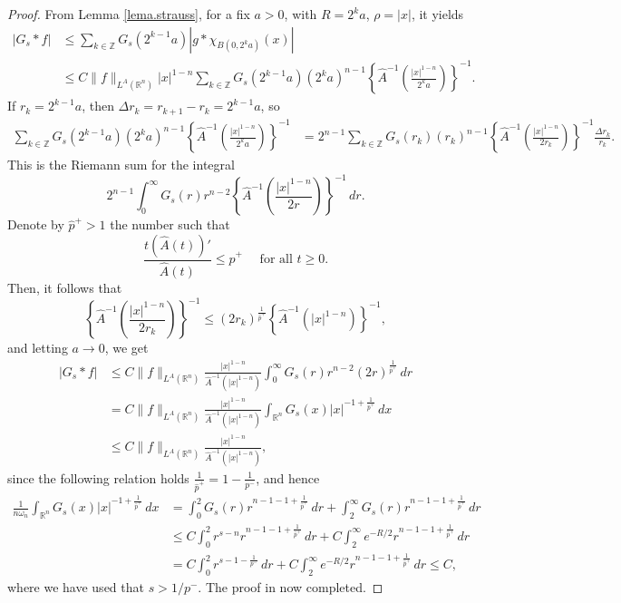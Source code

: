\documentclass[leqno,twoside, 12pt]{amsart}
\theoremstyle{plain}
\numberwithin{equation}{section} \numberwithin{figure}{section}
\theoremstyle{definition}
\newcommand{\R}{\mathbb R}
\numberwithin{equation}{section}
\begin{document}
\begin{proof}
From Lemma \ref{lema.strauss}, for a fix $a>0$, with $R=2^{k}a$, $\rho=|x|$, it  yields 
\begin{align*}
|G_s*f|&\leq \sum_{k\in \mathbb{Z}} G_s(2^{k-1}a) |g* \chi_{B(0,2^k a)}(x)|\\
&\leq C \|f\|_{L^A(\R^n)} |x|^{1-n} \sum_{k\in \mathbb{Z}} G_s(2^{k-1}a)   (2^k a)^{n-1} \left\{\hat A^{-1}\left( \frac{|x|^{1-n}}{2^k a}\right) \right\}^{-1}.
\end{align*}
If $r_k=2^{k-1}a$, then $\Delta r_k = r_{k+1}-r_k=2^{k-1}a$, so
\begin{align*}
\sum_{k\in \mathbb{Z}} G_s(2^{k-1}a)   (2^k a)^{n-1} \left\{\hat A^{-1}\left( \frac{|x|^{1-n}}{2^k a}\right) \right\}^{-1}&=
2^{n-1} \sum_{k\in \mathbb{Z}} G_s(r_k)   (r_k)^{n-1}  \left\{\hat A^{-1}\left( \frac{|x|^{1-n}}{2r_k}\right)  \right\}^{-1}\frac{\Delta r_k}{r_k}.
\end{align*}
This is the Riemann sum for the integral
$$
2^{n-1}\int_0^\infty G_s(r) r^{n-2} \left\{\hat A^{-1}\left( \frac{|x|^{1-n}}{2r}\right)  \right\}^{-1} \, dr.
$$
Denote by $\hat p^+>1$ the number such that
$$
\frac{t (\hat A(t))'}{\hat A(t)}\leq \hat p^+ \quad \text{ for all }t\geq 0.
$$
Then, it follows that
$$
\left\{\hat A^{-1}\left( \frac{|x|^{1-n}}{2r_k}\right)  \right\}^{-1}\leq  (2r_k)^\frac{1}{\hat p^+} \left\{\hat A^{-1}\left( |x|^{1-n}\right)  \right\}^{-1},
$$
and  letting $a\to 0$, we get
\begin{align*}
|G_s*f|&\leq C \|f\|_{L^A(\R^n)} \frac{|x|^{1-n}}{\hat A^{-1}(|x|^{1-n})} \int_0^\infty G_s(r) r^{n-2}  (2r)^\frac{1}{\hat p^+} \, dr\\
&= C \|f\|_{L^A(\R^n)} \frac{|x|^{1-n}}{\hat A^{-1}(|x|^{1-n})}  \int_{\R^n} G_s(x) |x|^{-1+\frac{1}{\hat p^+}} \, dx\\
&\leq  C \|f\|_{L^A(\R^n)} \frac{|x|^{1-n}}{\hat A^{-1}(|x|^{1-n})},  
\end{align*}
since the following relation holds $\frac{1}{\hat p^+}=1-\frac{1}{p^-}$, and hence
\begin{align*}
\frac{1}{n\omega_n}\int_{\R^n} G_s(x) |x|^{-1+\frac{1}{\hat p^+}} \, dx&=
\int_0^2 G_s(r) r^{n-1-1+\frac{1}{\hat p^+}} \, dr + 
\int_2^\infty G_s(r) r^{n-1-1+\frac{1}{\hat p^+}} \, dr\\
&\leq
C\int_0^2 r^{s-n}  r^{n-1-1+\frac{1}{\hat p^+}}\,dr +C \int_2^\infty e^{-R/2} r^{n-1-1+\frac{1}{\hat p^+}} \, dr\\
&=
C\int_0^2   r^{s-1-\frac{1}{p^-}}\,dr +C \int_2^\infty e^{-R/2} r^{n-1-1+\frac{1}{\hat p^+}} \, dr\leq C,
\end{align*}
where we have used that $s>1/p^-$.  The proof in now completed.
\end{proof}
\end{document}
